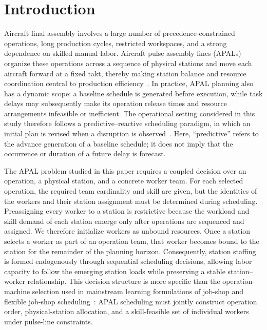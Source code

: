 \section{Introduction}
\label{sec:introduction}

Aircraft final assembly involves a large number of precedence-constrained operations, long production cycles, restricted workspaces, and a strong dependence on skilled manual labor. Aircraft pulse assembly lines (APALs) organize these operations across a sequence of physical stations and move each aircraft forward at a fixed takt, thereby making station balance and resource coordination central to production efficiency~\cite{bao2023afal,ai2025,wen2026ginppo}. In practice, APAL planning also has a dynamic scope: a baseline schedule is generated before execution, while task delays may subsequently make its operation release times and resource arrangements infeasible or inefficient. The operational setting considered in this study therefore follows a predictive--reactive scheduling paradigm, in which an initial plan is revised when a disruption is observed~\cite{vieira2003,moghaddam2022}. Here, ``predictive'' refers to the advance generation of a baseline schedule; it does not imply that the occurrence or duration of a future delay is forecast.

The APAL problem studied in this paper requires a coupled decision over an operation, a physical station, and a concrete worker team. For each selected operation, the required team cardinality and skill are given, but the identities of the workers and their station assignment must be determined during scheduling. Preassigning every worker to a station is restrictive because the workload and skill demand of each station emerge only after operations are sequenced and assigned. We therefore initialize workers as unbound resources. Once a station selects a worker as part of an operation team, that worker becomes bound to the station for the remainder of the planning horizon. Consequently, station staffing is formed endogenously through sequential scheduling decisions, allowing labor capacity to follow the emerging station loads while preserving a stable station--worker relationship. This decision structure is more specific than the operation--machine selection used in mainstream learning formulations of job-shop and flexible job-shop scheduling~\cite{zhang2020,park2021,wang2024}: APAL scheduling must jointly construct operation order, physical-station allocation, and a skill-feasible set of individual workers under pulse-line constraints.

